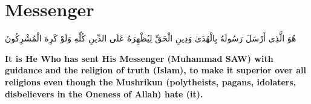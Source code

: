 \chapter{Messenger}
\begin{center}
    {\Huge    
        \begin{Arabic}
            هُوَ الَّذِي أَرْسَلَ رَسُولَهُ بِالْهُدَىٰ وَدِينِ الْحَقِّ لِيُظْهِرَهُ عَلَى الدِّينِ كُلِّهِ وَلَوْ كَرِهَ الْمُشْرِكُونَ
        \end{Arabic}
    }    
\end{center}
\vspace*{\fill}
\vspace{3cm}
\begin{center}
    \large \textbf{It is He Who has sent His Messenger (Muhammad SAW) with guidance and the religion of truth (Islam), to make it superior over all religions even though the Mushrikun (polytheists, pagans, idolaters, disbelievers in the Oneness of Allah) hate (it).}
\end{center}
